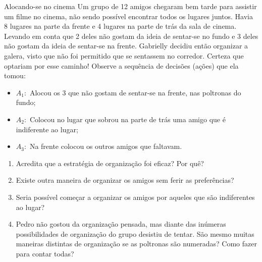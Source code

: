 \begin{task}{Alocando-se no cinema}
Um grupo de 12 amigos chegaram bem tarde para assistir um filme no cinema, não sendo possível encontrar todos os lugares juntos. Havia 8 lugares na parte da frente e 4 lugares na parte de trás da sala de cinema. Levando em conta que 2 deles não gostam da ideia de sentar-se no fundo e 3 deles não gostam da ideia de sentar-se na frente. Gabrielly decidiu então organizar a galera, visto que não foi permitido que se sentassem no corredor. Certeza que optariam por esse caminho! Observe a sequência de decisões (ações) que ela tomou:

\begin{itemize}
\item $A_1:$ Alocou os 3 que não gostam de 
sentar-se na frente, nas poltronas do fundo;

\item $A_2:$ Colocou no lugar que sobrou na parte de trás uma amigo que é indiferente ao lugar;

\item $A_3:$ Na frente colocou os outros amigos que faltavam. 
\end{itemize}


\begin{enumerate}
\item Acredita que a estratégia de organização foi eficaz? Por quê?
\item Existe outra maneira de organizar os amigos sem ferir as preferências?
\item Seria possível começar a organizar os amigos por aqueles que são indiferentes ao lugar? 
\item Pedro não gostou da organização pensada, mas diante das inúmeras possibilidades de organização do grupo desistiu de tentar. São mesmo muitas maneiras distintas de organização se as poltronas são numeradas? Como fazer para contar todas?
\end{enumerate}
\end{task}

